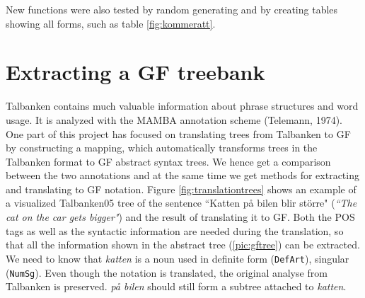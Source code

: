 \documentclass{report}
\begin{document}
New functions were also tested by random generating and by creating tables showing
all forms, such as table \ref{fig:kommeratt}.




\chapter{Extracting a GF treebank} %
\label{sec:Mapping}
Talbanken contains much valuable information about phrase structures and word 
usage. It is analyzed with the MAMBA annotation scheme (Telemann, 1974).%
One part of this project has focused on translating trees from Talbanken to GF
by constructing a mapping, which 
automatically transforms trees in the Talbanken format to GF abstract syntax trees.
We hence get a comparison between the two annotations and at the same time
we get methods for extracting and translating to GF notation. 
Figure \ref{fig:translationtrees} shows an example of a visualized Talbanken05 tree
of the sentence ``Katten på bilen blir större" (\emph{``The cat on the car gets bigger"})
and the result of translating it to GF.
Both the POS tags as well as the syntactic information are needed
during the translation, so that all the information shown in the abstract tree
(\ref{pic:gftree}) can be extracted. We need to know that \emph{katten} is a noun
used in definite form (\verb-DefArt-), singular (\verb-NumSg-). Even though the
notation is translated, the original analyse from Talbanken
is preserved.
\emph{på bilen} should still form a subtree attached to \emph{katten}.
\end{document}
